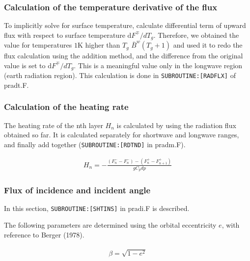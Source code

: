 \hypertarget{calculation-of-the-temperature-derivative-of-the-flux}{%
\subsubsection{Calculation of the temperature derivative of the flux}\label{calculation-of-the-temperature-derivative-of-the-flux}}

To implicitly solve for surface temperature, calculate differential term of upward flux with respect to surface temperature \(\mathrm{d}F^{\mp}/dT_{g}\). Therefore, we obtained the value for
temperatures \(1\text{K}\) higher than \(T_g\) \(\bar{B}^{w}\left(T_{g}+1\right)\) and used it to redo the flux calculation using the addition method, and the difference from the original value is set
to \(\mathrm{d}F^{\mp}/dT_{g}\). This is a meaningful value only in the longwave region (earth radiation region). This calculation is done in \texttt{SUBROUTINE:{[}RADFLX{]}} of pradt.F.

\hypertarget{calculation-of-the-heating-rate}{%
\subsubsection{Calculation of the heating rate}\label{calculation-of-the-heating-rate}}

The heating rate of the nth layer \(H_n\) is calculated by using the radiation flux obtained so far. It is calculated separately for shortwave and longwave ranges, and finally add together
(\texttt{SUBROUTINE:{[}RDTND{]}} in pradm.F).

\begin{eqnarray}
H_{n}=-\frac{\left(F_{n}^{-}-F_{n}^{-}\right)-\left(F_{n}^{+}-F_{n+1}^{+}\right)}{g C_{p} d p}
\end{eqnarray}

\hypertarget{flux-of-incidence-and-incident-angle}{%
\subsubsection{Flux of incidence and incident angle}\label{flux-of-incidence-and-incident-angle}}

In this section, \texttt{SUBROUTINE:{[}SHTINS{]}} in pradi.F is described.

The following parameters are determined using the orbital eccentricity \(e\), with reference to Berger (1978).

\begin{eqnarray}
\begin{array}{l}
\beta=\sqrt{1-e^{2}}
\end{array}
\end{eqnarray}

